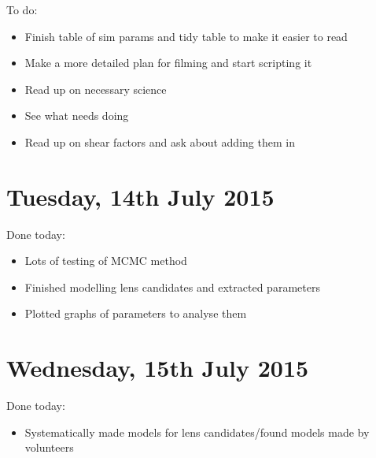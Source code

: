 \documentclass{article}
\begin{document}
\noindent To do:
\begin{itemize}
  \item Finish table of sim params and tidy table to make it easier to read
  \item Make a more detailed plan for filming and start scripting it
  \item Read up on necessary science
  \item See what needs doing
  \item Read up on shear factors and ask about adding them in
\end{itemize}\newpage

\section{Tuesday, 14th July 2015}
\noindent Done today:
\begin{itemize}
  \item Lots of testing of MCMC method
  \item Finished modelling lens candidates and extracted parameters
  \item Plotted graphs of parameters to analyse them
\end{itemize}\newpage

\section{Wednesday, 15th July 2015}
\noindent Done today:
\begin{itemize}
  \item Systematically made models for lens candidates/found models made by volunteers
\end{itemize}
\end{document}
